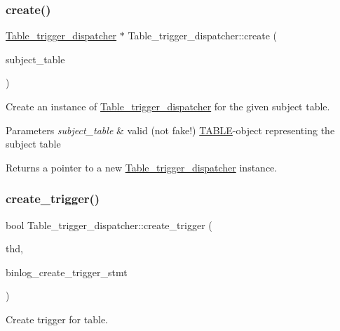 \subsubsection{\texorpdfstring{create()}{create()}}
{\footnotesize\ttfamily \mbox{\hyperlink{classTable__trigger__dispatcher}{Table\+\_\+trigger\+\_\+dispatcher}} $\ast$ Table\+\_\+trigger\+\_\+dispatcher\+::create (\begin{DoxyParamCaption}\item[{\mbox{\hyperlink{structTABLE}{T\+A\+B\+LE}} $\ast$}]{subject\+\_\+table }\end{DoxyParamCaption})\hspace{0.3cm}{\ttfamily [static]}}

Create an instance of \mbox{\hyperlink{classTable__trigger__dispatcher}{Table\+\_\+trigger\+\_\+dispatcher}} for the given subject table.


\begin{DoxyParams}{Parameters}
{\em subject\+\_\+table} & valid (not fake!) \mbox{\hyperlink{structTABLE}{T\+A\+B\+LE}}-\/object representing the subject table\\
\hline
\end{DoxyParams}
\begin{DoxyReturn}{Returns}
a pointer to a new \mbox{\hyperlink{classTable__trigger__dispatcher}{Table\+\_\+trigger\+\_\+dispatcher}} instance. 
\end{DoxyReturn}
\mbox{\label{classTable__trigger__dispatcher_ae95758893205106c0bd68e655c40da90}} 
\subsubsection{\texorpdfstring{create\+\_\+trigger()}{create\_trigger()}}
{\footnotesize\ttfamily bool Table\+\_\+trigger\+\_\+dispatcher\+::create\+\_\+trigger (\begin{DoxyParamCaption}\item[{T\+HD $\ast$}]{thd,  }\item[{String $\ast$}]{binlog\+\_\+create\+\_\+trigger\+\_\+stmt }\end{DoxyParamCaption})}

Create trigger for table.


